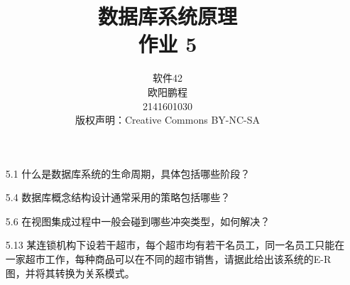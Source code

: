 \documentclass[]{ctexart}
\title{数据库系统原理 \\ 作业 5}
\author{软件42 \\ 欧阳鹏程 \\ 2141601030 \\ 版权声明：Creative Commons BY-NC-SA}
\begin{document}
\maketitle

\begin{enumerate}
	\item[5.1] 什么是数据库系统的生命周期，具体包括哪些阶段？
	

	\item[5.4] 数据库概念结构设计通常采用的策略包括哪些？
	

	\item[5.6] 在视图集成过程中一般会碰到哪些冲突类型，如何解决？
	
	
	\item[5.13] 某连锁机构下设若干超市，每个超市均有若干名员工，同一名员工只能在一家超市工作，每种商品可以在不同的超市销售，请据此给出该系统的E-R图，并将其转换为关系模式。
	
\end{enumerate}
\end{document}

